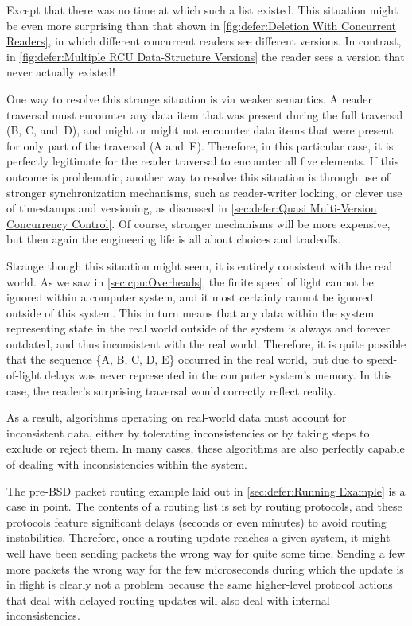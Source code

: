 Except that there was no time at which such a list existed.
This situation might be even more surprising than that shown in
\cref{fig:defer:Deletion With Concurrent Readers},
in which different concurrent readers see different versions.
In contrast, in
\cref{fig:defer:Multiple RCU Data-Structure Versions}
the reader sees a version that never actually existed!

One way to resolve this strange situation is via weaker semantics.
A reader traversal must encounter any data item that was present
during the full traversal (B, C, and~D), and might or might not
encounter data items that were present for only part of the
traversal (A and~E)\@.
Therefore, in this particular case, it is perfectly legitimate for
the reader traversal to encounter all five elements.
If this outcome is problematic, another way to resolve this situation is
through use of stronger synchronization mechanisms, such as reader-writer
locking, or clever use of timestamps and versioning,
as discussed in \cref{sec:defer:Quasi Multi-Version Concurrency Control}.
Of course, stronger mechanisms will be more expensive, but then again
the engineering life is all about choices and tradeoffs.

Strange though this situation might seem, it is entirely consistent with
the real world.
As we saw in
\cref{sec:cpu:Overheads},
the finite speed of light cannot be ignored within a computer system,
and it most certainly cannot be ignored outside of this system.
This in turn means that any data within the system representing state
in the real world outside of the system is always and forever outdated,
and thus inconsistent with the real world.
Therefore, it is quite possible that the sequence \{A, B, C, D, E\}
occurred in the real world, but due to speed-of-light delays was
never represented in the computer system's memory.
In this case, the reader's surprising traversal would correctly reflect
reality.

As a result, algorithms operating on real-world data must account for
inconsistent data, either by tolerating inconsistencies or by taking
steps to exclude or reject them.
In many cases, these algorithms are also perfectly capable of dealing
with inconsistencies within the system.

The pre-BSD packet routing example laid out in
\cref{sec:defer:Running Example}
is a case in point.
The contents of a routing list is set by routing protocols, and these
protocols feature significant delays (seconds or even minutes) to avoid
routing instabilities.
Therefore, once a routing update reaches a given system,
it might well have been sending packets the wrong way for quite some time.
Sending a few more packets the wrong way for the few microseconds during
which the update is in flight is clearly not a problem because the same
higher-level protocol actions that deal with delayed routing updates
will also deal with internal inconsistencies.

